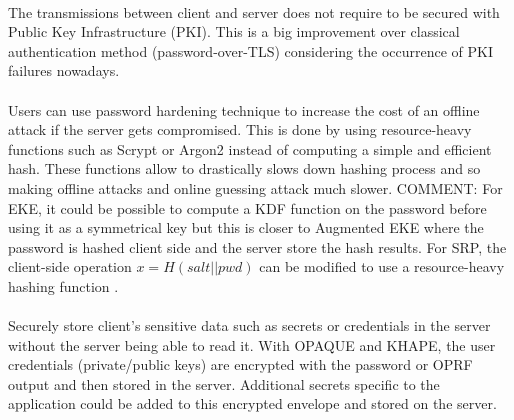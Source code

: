 ﻿\documentclass[../report.tex]{subfiles}
\begin{document}
\paragraph{} %
The transmissions between client and server does not require to be secured with Public Key Infrastructure (PKI). This is a big improvement over classical authentication method (password-over-TLS) considering the occurrence of PKI failures nowadays. %
\paragraph{} \label{sec:password_hardening_comparison}
Users can use password hardening technique to increase the cost of an offline attack if the server gets compromised. This is done by using resource-heavy functions such as Scrypt \cite{Scrypt_Paper} or Argon2 \cite{Argon2_Paper} instead of computing a simple and efficient hash. These functions allow to drastically slows down hashing process and so making offline attacks and online guessing attack much slower.
COMMENT: For EKE, it could be possible to compute a KDF function on the password before using it as a symmetrical key but this is closer to Augmented EKE \cite{AEKE_Paper} where the password is hashed client side and the server store the hash results.
For SRP, the client-side operation $x = H(salt||pwd)$ can be modified to use a resource-heavy hashing function \cite{SRP_1Password_blog}.
\paragraph{}
Securely store client's sensitive data such as secrets or credentials in the server without the server being able to read it. With OPAQUE and KHAPE, the user credentials (private/public keys) are encrypted with the password or OPRF output and then stored in the server. Additional secrets specific to the application could be added to this encrypted envelope and stored on the server.
\end{document}
